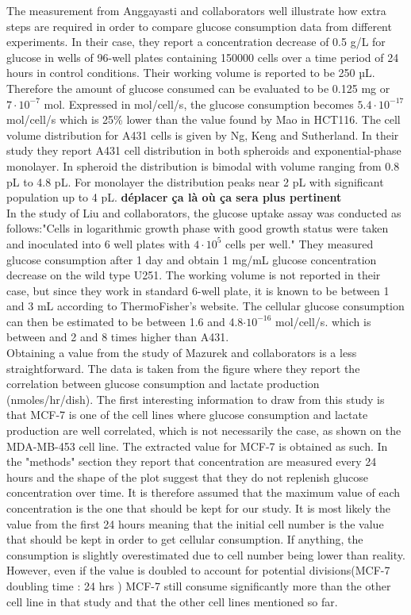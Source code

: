 \documentclass[11pt,a4paper]{article}
\begin{document}
The measurement from Anggayasti and collaborators well illustrate how extra steps are required in order to compare glucose consumption data from different experiments. In their case, they report a concentration decrease of 0.5 g/L for glucose in wells of 96-well plates containing 150000 cells over a time period of 24 hours in control conditions. Their working volume is reported to be 250 µL. Therefore the amount of glucose consumed can be evaluated to be 0.125 mg or $7 \cdot 10^{-7}$ mol. Expressed in mol/cell/s, the glucose consumption becomes $5.4 \cdot 10^{-17}$ mol/cell/s which is 25\% lower than the value found by Mao in HCT116. The cell volume distribution for A431 cells is given by Ng, Keng and Sutherland. In their study they report A431 cell distribution in both spheroids and exponential-phase monolayer. In spheroid the distribution is bimodal with volume ranging from 0.8 pL to 4.8 pL. For monolayer the distribution peaks near 2 pL with significant population up to 4 pL.\cite{Ng1987} \textbf{déplacer ça là où ça sera plus pertinent}\\

In the study of Liu and collaborators, the glucose uptake assay was conducted as follows:"Cells in logarithmic growth phase with good growth status were taken and inoculated into 6 well plates with $4 \cdot 10^5$ cells per well." They measured glucose consumption after 1 day and obtain 1 mg/mL glucose concentration decrease on the wild type U251. The working volume is not reported in their case, but since they work in standard 6-well plate, it is known to be between 1 and 3 mL according to ThermoFisher's website. The cellular glucose consumption can then be estimated to be between 1.6 and 4.8$\cdot 10^{-16}$ mol/cell/s. which is between and 2 and 8 times higher than A431.\\ 

Obtaining a value from the study of Mazurek and collaborators is a less straightforward. The data is taken from the figure where they report the correlation between glucose consumption and lactate production (nmoles/hr/dish). The first interesting information to draw from this study is that MCF-7 is one of the cell lines where glucose consumption and lactate production are well correlated, which is not necessarily the case, as shown on the MDA-MB-453 cell line.\cite{Mazurek1997} The extracted value for MCF-7 is obtained as such. In the "methods" section they report that concentration are measured every 24 hours and the shape of the plot suggest that they do not replenish glucose concentration over time. It is therefore assumed that the maximum value of each concentration is the one that should be kept for our study. It is most likely the value from the first 24 hours meaning that the initial cell number is the value that should be kept in order to get cellular consumption. If anything, the consumption is slightly overestimated due to cell number being lower than reality. However, even if the value is doubled to account for potential divisions(MCF-7 doubling time :  24 hrs \cite{Sutherland1983}) MCF-7 still consume significantly more than the other cell line in that study and that the other cell lines mentioned so far.\\
\end{document}
